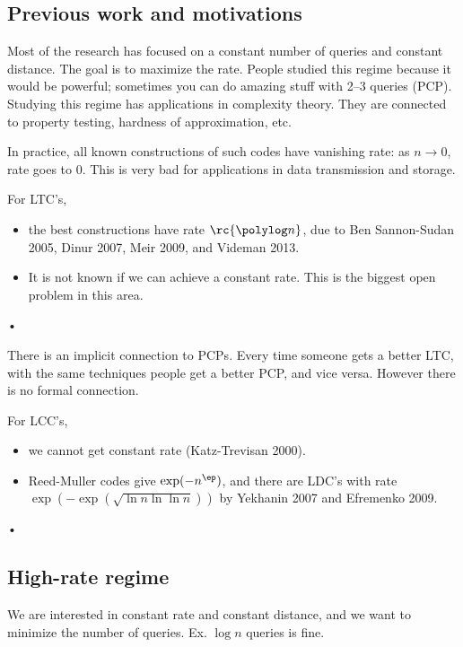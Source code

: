 \subsection{Previous work and motivations}
Most of the research has focused on a constant number of queries and constant distance. The goal is to maximize the rate.  People studied this regime because it would be powerful; sometimes you can do amazing stuff with 2--3 queries (PCP). Studying this regime has applications in complexity theory. They are connected to property testing, hardness of approximation, etc.

In practice, all known constructions of such codes have vanishing rate: as $n\to 0$, rate goes to 0. This is very bad for applications in data transmission and storage.

For LTC's,
\begin{itemize}
\item
the best constructions have rate $\rc{\polylog n}$, due to Ben Sannon-Sudan 2005, Dinur 2007, Meir 2009, and Videman 2013.
\item It is not known if we can achieve a constant rate. This is the biggest open problem in this area. 
\end{itemize}• 

There is an implicit connection to PCPs. Every time someone gets a better LTC, with the same techniques people get a better PCP, and vice versa. However there is no formal connection.

For LCC's, 
\begin{itemize}
\item
we cannot get constant rate (Katz-Trevisan 2000). 
\item
Reed-Muller codes give $\exp(-n^{\ep})$, and there are LDC's with rate $\exp(-\exp(\sqrt{\ln n \ln\ln n}))$ by Yekhanin 2007 and Efremenko 2009.
\end{itemize}•
\subsection{High-rate regime}

We are interested in constant rate and constant distance, and we want to minimize the number of queries. Ex. $\log n$ queries is fine.


